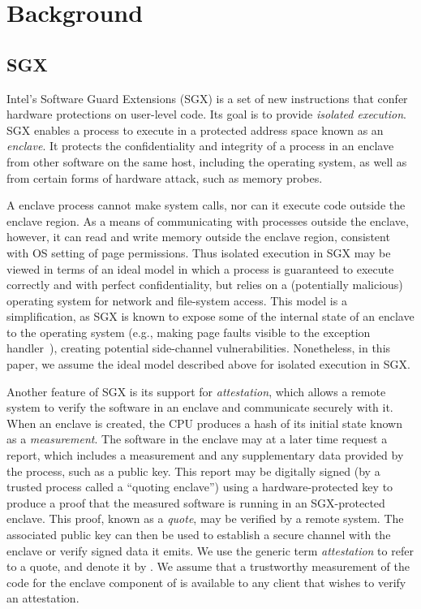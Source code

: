 \section{Background}
\subsection{SGX}
Intel's Software Guard Extensions (SGX) is a set of new instructions that confer hardware protections on user-level code. Its goal is to provide \emph{isolated execution}. SGX enables a process to execute in a protected address space known as an {\em enclave}. It protects the confidentiality and integrity of a process in an enclave from other software on the same host, including the operating system, as well as from certain forms of hardware attack, such as memory probes. 

A enclave process cannot make system calls, nor can it execute code outside the enclave region. As a means of communicating with processes outside the enclave, however, it can read and write memory outside the enclave region, consistent with OS setting of page permissions. Thus  isolated execution in SGX may be viewed in terms of an ideal model in which a process is guaranteed to execute correctly and with perfect confidentiality, but relies on a (potentially malicious) operating system for network and file-system access. This model is a simplification, as SGX is known to expose some of the internal state of an enclave to the operating system (e.g., making page faults visible to the exception handler~\cite{}), creating potential side-channel vulnerabilities. Nonetheless, in this paper, we assume the ideal model described above for isolated execution in SGX.

Another feature of SGX is its support for \emph{attestation}, which allows a remote system to verify the software in an enclave and communicate securely with it. When an enclave is created, the CPU produces a hash of its initial state known as a {\em measurement}. The software in the enclave may at a later time request a report, which includes a measurement and any supplementary data provided by the process, such as a public key. This report may be digitally signed (by a trusted process called a ``quoting enclave'') using a hardware-protected key to produce a proof that the measured software is running in an SGX-protected enclave. This proof, known as a {\em quote}, may be verified by a remote system. The associated public key can then be used to establish a secure channel with the enclave or verify signed data it emits. We use the generic term {\em attestation} to refer to a quote, and denote it by \att. We assume that a trustworthy measurement of the code for the enclave component of \tc is available to any client that wishes to verify an attestation.

